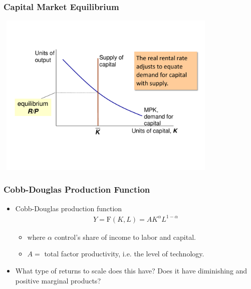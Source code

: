 \documentclass[handout]{beamer}
\begin{document}

\begin{frame}[t]
\frametitle{Capital Market Equilibrium}
\begin{center}
\includegraphics[height=3.1in,width=4.25in]{../Figures/capital_demand.pdf}
\end{center}
\end{frame}

\begin{frame}[t]
\frametitle{Cobb-Douglas Production Function}
\begin{itemize}
\item Cobb-Douglas production function
\begin{eqnarray*}
Y = \mbox{F}(K,L) = A K^\alpha L^{1-\alpha}
\end{eqnarray*}
\begin{itemize}
\item where $\alpha$ control's share of income to labor and capital.
\medskip
\item $A = $ total factor productivity, i.e. the level of technology.
\end{itemize}
\bigskip
\item What type of returns to scale does this have? Does it have diminishing and positive marginal products?
\end{itemize}
\end{frame}
\end{document}
